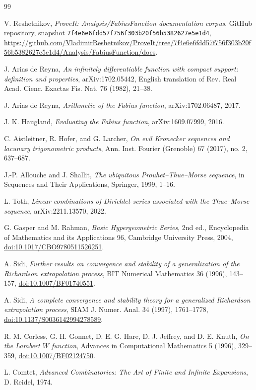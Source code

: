 \documentclass[11pt,oneside]{article}
\numberwithin{equation}{section}
\theoremstyle{frontier}
\theoremstyle{definition}
\theoremstyle{remark}
\newcommand{\doi}[1]{\href{https://doi.org/#1}{doi:#1}}
\newcommand{\commitsha}{\nolinkurl{7f4e6e6fdd57f756f303b20f56b5382627e5e1d4}}
\begin{document}
\begin{thebibliography}{99}

V. Reshetnikov,
\emph{ProveIt: Analysis/FabiusFunction documentation corpus},
GitHub repository, snapshot \commitsha,
\url{https://github.com/VladimirReshetnikov/ProveIt/tree/7f4e6e6fdd57f756f303b20f56b5382627e5e1d4/Analysis/FabiusFunction/docs}.

J. Arias de Reyna,
\emph{An infinitely differentiable function with compact support: definition and properties},
arXiv:1702.05442, English translation of Rev. Real Acad. Cienc. Exactas Fis. Nat. 76 (1982), 21--38.

J. Arias de Reyna,
\emph{Arithmetic of the Fabius function},
arXiv:1702.06487, 2017.

J. K. Haugland,
\emph{Evaluating the Fabius function},
arXiv:1609.07999, 2016.

C. Aistleitner, R. Hofer, and G. Larcher,
\emph{On evil Kronecker sequences and lacunary trigonometric products},
Ann. Inst. Fourier (Grenoble) 67 (2017), no. 2, 637--687.

J.-P. Allouche and J. Shallit,
\emph{The ubiquitous Prouhet--Thue--Morse sequence},
in Sequences and Their Applications, Springer, 1999, 1--16.

L. Toth,
\emph{Linear combinations of Dirichlet series associated with the Thue--Morse sequence},
arXiv:2211.13570, 2022.

G. Gasper and M. Rahman,
\emph{Basic Hypergeometric Series}, 2nd ed.,
Encyclopedia of Mathematics and its Applications 96, Cambridge University Press, 2004,
\doi{10.1017/CBO9780511526251}.

A. Sidi,
\emph{Further results on convergence and stability of a generalization of the Richardson extrapolation process},
BIT Numerical Mathematics 36 (1996), 143--157,
\doi{10.1007/BF01740551}.

A. Sidi,
\emph{A complete convergence and stability theory for a generalized Richardson extrapolation process},
SIAM J. Numer. Anal. 34 (1997), 1761--1778,
\doi{10.1137/S0036142994278589}.

R. M. Corless, G. H. Gonnet, D. E. G. Hare, D. J. Jeffrey, and D. E. Knuth,
\emph{On the Lambert $W$ function},
Advances in Computational Mathematics 5 (1996), 329--359,
\doi{10.1007/BF02124750}.

L. Comtet,
\emph{Advanced Combinatorics: The Art of Finite and Infinite Expansions},
D. Reidel, 1974.

\end{thebibliography}
\end{document}
